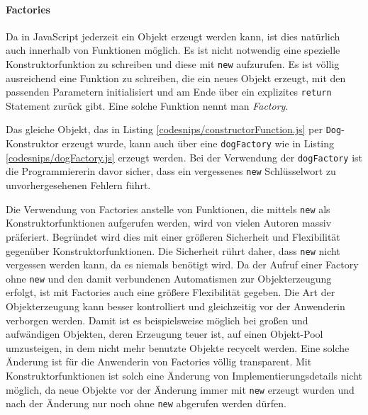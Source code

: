

\paragraph{Factories}

Da in JavaScript jederzeit ein Objekt erzeugt werden kann, ist dies natürlich auch innerhalb von Funktionen möglich. Es ist nicht notwendig eine spezielle Konstruktorfunktion zu schreiben und diese mit \texttt{new} aufzurufen. Es ist völlig ausreichend eine Funktion zu schreiben, die ein neues Objekt erzeugt, mit den passenden Parametern initialisiert und am Ende über ein explizites \texttt{return} Statement zurück gibt. Eine solche Funktion nennt man \emph{Factory}. 

Das gleiche Objekt, das in Listing \ref{codesnips/constructorFunction.js} per \texttt{Dog}-Konstruktor erzeugt wurde, kann auch über eine \texttt{dogFactory} wie in Listing \ref{codesnips/dogFactory.js} erzeugt werden. Bei der Verwendung der \texttt{dogFactory} ist die Programmiererin davor sicher, dass ein vergessenes \texttt{new} Schlüsselwort zu unvorhergesehenen Fehlern führt.


Die Verwendung von Factories anstelle von Funktionen, die mittels \texttt{new} als Konstruktorfunktionen aufgerufen werden, wird von vielen Autoren massiv präferiert. Begründet wird dies mit einer größeren Sicherheit und Flexibilität gegenüber Konstruktorfunktionen. Die Sicherheit rührt daher, dass \texttt{new} nicht vergessen werden kann, da es niemals benötigt wird. Da der Aufruf einer Factory ohne \texttt{new} und den damit verbundenen Automatismen zur Objekterzeugung erfolgt, ist mit Factories auch eine größere Flexibilität gegeben. Die Art der Objekterzeugung kann besser kontrolliert und gleichzeitig vor der Anwenderin verborgen werden. Damit ist es beispielsweise möglich bei großen und aufwändigen Objekten, deren Erzeugung teuer ist, auf einen Objekt-Pool umzusteigen, in dem nicht mehr benutzte Objekte recycelt werden. Eine solche Änderung ist für die Anwenderin von Factories völlig transparent. Mit Konstruktorfunktionen ist solch eine Änderung von Implementierungsdetails nicht möglich, da neue Objekte vor der Änderung immer mit \texttt{new} erzeugt wurden und nach der Änderung nur noch ohne \texttt{new} abgerufen werden dürfen.

